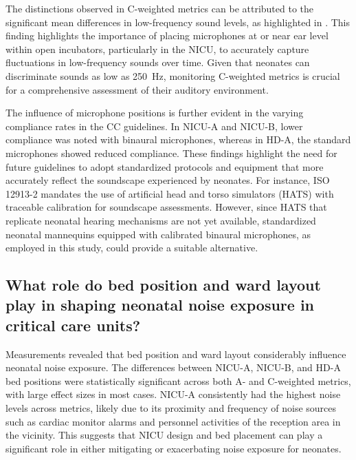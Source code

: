 The distinctions observed in C-weighted metrics can be attributed to the significant mean differences in low-frequency sound levels, as highlighted in . This finding highlights the importance of placing microphones at or near ear level within open incubators, particularly in the NICU, to accurately capture fluctuations in low-frequency sounds over time. Given that neonates can discriminate sounds as low as \SI{250}{\hertz}, monitoring C-weighted metrics is crucial for a comprehensive assessment of their auditory environment.

The influence of microphone positions is further evident in the varying compliance rates in the CC guidelines. In NICU-A and NICU-B, lower compliance was noted with binaural microphones, whereas in HD-A, the standard microphones showed reduced compliance. These findings highlight the need for future guidelines to adopt standardized protocols and equipment that more accurately reflect the soundscape experienced by neonates. For instance, ISO 12913-2 \citep{iso12913-2} mandates the use of artificial head and torso simulators (HATS) with traceable calibration for soundscape assessments. However, since HATS that replicate neonatal hearing mechanisms are not yet available, standardized neonatal mannequins equipped with calibrated binaural microphones, as employed in this study, could provide a suitable alternative. 


\subsection{What role do bed position and ward layout play in
shaping neonatal noise exposure in critical care units?}
\label{sec:rq2bedward}

Measurements revealed that bed position and ward layout considerably influence neonatal noise exposure. The differences between NICU-A, NICU-B, and HD-A bed positions were statistically significant across both A- and C-weighted metrics, with large effect sizes in most cases. NICU-A consistently had the highest noise levels across metrics, likely due to its proximity and frequency of noise sources such as cardiac monitor alarms and personnel activities of the reception area in the vicinity. This suggests that NICU design and bed placement can play a significant role in either mitigating or exacerbating noise exposure for neonates.

